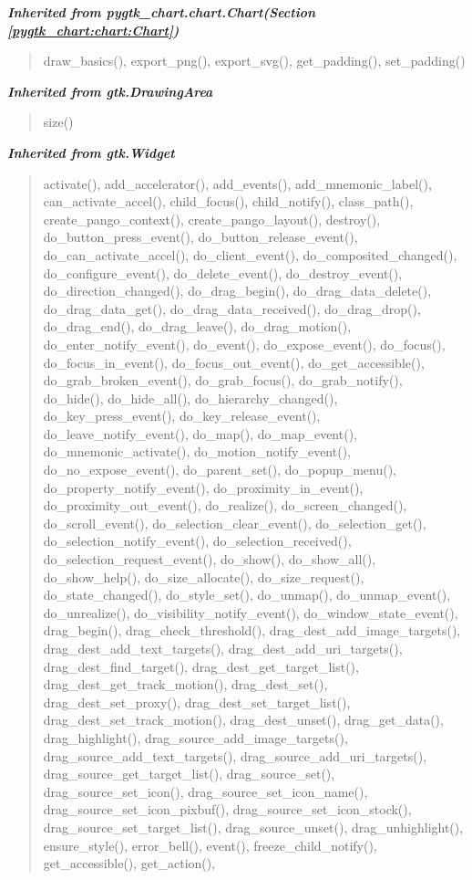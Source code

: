 \large{\textbf{\textit{Inherited from pygtk\_chart.chart.Chart\textit{(Section \ref{pygtk_chart:chart:Chart})}}}}

\begin{quote}
draw\_basics(), export\_png(), export\_svg(), get\_padding(), set\_padding()
\end{quote}

\large{\textbf{\textit{Inherited from gtk.DrawingArea}}}

\begin{quote}
size()
\end{quote}

\large{\textbf{\textit{Inherited from gtk.Widget}}}

\begin{quote}
activate(), add\_accelerator(), add\_events(), add\_mnemonic\_label(), can\_activate\_accel(), child\_focus(), child\_notify(), class\_path(), create\_pango\_context(), create\_pango\_layout(), destroy(), do\_button\_press\_event(), do\_button\_release\_event(), do\_can\_activate\_accel(), do\_client\_event(), do\_composited\_changed(), do\_configure\_event(), do\_delete\_event(), do\_destroy\_event(), do\_direction\_changed(), do\_drag\_begin(), do\_drag\_data\_delete(), do\_drag\_data\_get(), do\_drag\_data\_received(), do\_drag\_drop(), do\_drag\_end(), do\_drag\_leave(), do\_drag\_motion(), do\_enter\_notify\_event(), do\_event(), do\_expose\_event(), do\_focus(), do\_focus\_in\_event(), do\_focus\_out\_event(), do\_get\_accessible(), do\_grab\_broken\_event(), do\_grab\_focus(), do\_grab\_notify(), do\_hide(), do\_hide\_all(), do\_hierarchy\_changed(), do\_key\_press\_event(), do\_key\_release\_event(), do\_leave\_notify\_event(), do\_map(), do\_map\_event(), do\_mnemonic\_activate(), do\_motion\_notify\_event(), do\_no\_expose\_event(), do\_parent\_set(), do\_popup\_menu(), do\_property\_notify\_event(), do\_proximity\_in\_event(), do\_proximity\_out\_event(), do\_realize(), do\_screen\_changed(), do\_scroll\_event(), do\_selection\_clear\_event(), do\_selection\_get(), do\_selection\_notify\_event(), do\_selection\_received(), do\_selection\_request\_event(), do\_show(), do\_show\_all(), do\_show\_help(), do\_size\_allocate(), do\_size\_request(), do\_state\_changed(), do\_style\_set(), do\_unmap(), do\_unmap\_event(), do\_unrealize(), do\_visibility\_notify\_event(), do\_window\_state\_event(), drag\_begin(), drag\_check\_threshold(), drag\_dest\_add\_image\_targets(), drag\_dest\_add\_text\_targets(), drag\_dest\_add\_uri\_targets(), drag\_dest\_find\_target(), drag\_dest\_get\_target\_list(), drag\_dest\_get\_track\_motion(), drag\_dest\_set(), drag\_dest\_set\_proxy(), drag\_dest\_set\_target\_list(), drag\_dest\_set\_track\_motion(), drag\_dest\_unset(), drag\_get\_data(), drag\_highlight(), drag\_source\_add\_image\_targets(), drag\_source\_add\_text\_targets(), drag\_source\_add\_uri\_targets(), drag\_source\_get\_target\_list(), drag\_source\_set(), drag\_source\_set\_icon(), drag\_source\_set\_icon\_name(), drag\_source\_set\_icon\_pixbuf(), drag\_source\_set\_icon\_stock(), drag\_source\_set\_target\_list(), drag\_source\_unset(), drag\_unhighlight(), ensure\_style(), error\_bell(), event(), freeze\_child\_notify(), get\_accessible(), get\_action(), 
\end{quote}
